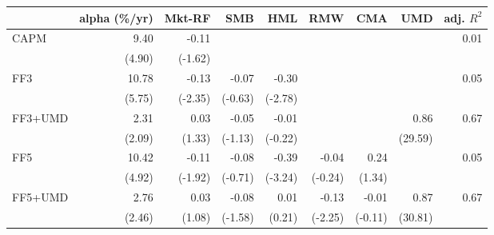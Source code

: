 \begin{tabular}{lrrrrrrrr}
\toprule
 & alpha (\%/yr) & Mkt-RF & SMB & HML & RMW & CMA & UMD & adj. $R^2$ \\
\midrule
CAPM & 9.40 & -0.11 &  &  &  &  &  & 0.01 \\
 & (4.90) & (-1.62) &  &  &  &  &  &  \\[2pt]
FF3 & 10.78 & -0.13 & -0.07 & -0.30 &  &  &  & 0.05 \\
 & (5.75) & (-2.35) & (-0.63) & (-2.78) &  &  &  &  \\[2pt]
FF3+UMD & 2.31 & 0.03 & -0.05 & -0.01 &  &  & 0.86 & 0.67 \\
 & (2.09) & (1.33) & (-1.13) & (-0.22) &  &  & (29.59) &  \\[2pt]
FF5 & 10.42 & -0.11 & -0.08 & -0.39 & -0.04 & 0.24 &  & 0.05 \\
 & (4.92) & (-1.92) & (-0.71) & (-3.24) & (-0.24) & (1.34) &  &  \\[2pt]
FF5+UMD & 2.76 & 0.03 & -0.08 & 0.01 & -0.13 & -0.01 & 0.87 & 0.67 \\
 & (2.46) & (1.08) & (-1.58) & (0.21) & (-2.25) & (-0.11) & (30.81) &  \\[2pt]
\bottomrule
\end{tabular}
